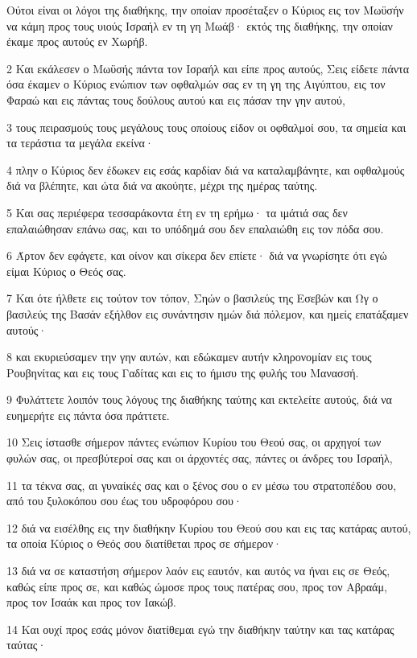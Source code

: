 \par Ούτοι είναι οι λόγοι της διαθήκης, την οποίαν προσέταξεν ο Κύριος εις τον Μωϋσήν να κάμη προς τους υιούς Ισραήλ εν τη γη Μωάβ· εκτός της διαθήκης, την οποίαν έκαμε προς αυτούς εν Χωρήβ.
\par 2 Και εκάλεσεν ο Μωϋσής πάντα τον Ισραήλ και είπε προς αυτούς, Σεις είδετε πάντα όσα έκαμεν ο Κύριος ενώπιον των οφθαλμών σας εν τη γη της Αιγύπτου, εις τον Φαραώ και εις πάντας τους δούλους αυτού και εις πάσαν την γην αυτού,
\par 3 τους πειρασμούς τους μεγάλους τους οποίους είδον οι οφθαλμοί σου, τα σημεία και τα τεράστια τα μεγάλα εκείνα·
\par 4 πλην ο Κύριος δεν έδωκεν εις εσάς καρδίαν διά να καταλαμβάνητε, και οφθαλμούς διά να βλέπητε, και ώτα διά να ακούητε, μέχρι της ημέρας ταύτης.
\par 5 Και σας περιέφερα τεσσαράκοντα έτη εν τη ερήμω· τα ιμάτιά σας δεν επαλαιώθησαν επάνω σας, και το υπόδημά σου δεν επαλαιώθη εις τον πόδα σου.
\par 6 Άρτον δεν εφάγετε, και οίνον και σίκερα δεν επίετε· διά να γνωρίσητε ότι εγώ είμαι Κύριος ο Θεός σας.
\par 7 Και ότε ήλθετε εις τούτον τον τόπον, Σηών ο βασιλεύς της Εσεβών και Ωγ ο βασιλεύς της Βασάν εξήλθον εις συνάντησιν ημών διά πόλεμον, και ημείς επατάξαμεν αυτούς·
\par 8 και εκυριεύσαμεν την γην αυτών, και εδώκαμεν αυτήν κληρονομίαν εις τους Ρουβηνίτας και εις τους Γαδίτας και εις το ήμισυ της φυλής του Μανασσή.
\par 9 Φυλάττετε λοιπόν τους λόγους της διαθήκης ταύτης και εκτελείτε αυτούς, διά να ευημερήτε εις πάντα όσα πράττετε.
\par 10 Σεις ίστασθε σήμερον πάντες ενώπιον Κυρίου του Θεού σας, οι αρχηγοί των φυλών σας, οι πρεσβύτεροί σας και οι άρχοντές σας, πάντες οι άνδρες του Ισραήλ,
\par 11 τα τέκνα σας, αι γυναίκές σας και ο ξένος σου ο εν μέσω του στρατοπέδου σου, από του ξυλοκόπου σου έως του υδροφόρου σου·
\par 12 διά να εισέλθης εις την διαθήκην Κυρίου του Θεού σου και εις τας κατάρας αυτού, τα οποία Κύριος ο Θεός σου διατίθεται προς σε σήμερον·
\par 13 διά να σε καταστήση σήμερον λαόν εις εαυτόν, και αυτός να ήναι εις σε Θεός, καθώς είπε προς σε, και καθώς ώμοσε προς τους πατέρας σου, προς τον Αβραάμ, προς τον Ισαάκ και προς τον Ιακώβ.
\par 14 Και ουχί προς εσάς μόνον διατίθεμαι εγώ την διαθήκην ταύτην και τας κατάρας ταύτας·
